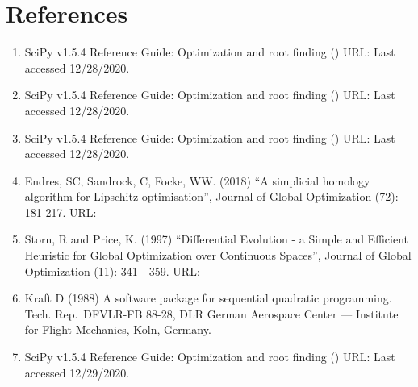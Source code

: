 \documentclass[letterpaper,10pt,english]{sphinxmanual}
\begin{document}
\section{References}
\label{\detokenize{doc-src/optimizers:references}}\begin{enumerate}
\def\theenumi{\arabic{enumi}}
\def\labelenumi{\theenumi .}
\makeatletter\def\p@enumii{\p@enumi \theenumi .}\makeatother
\item {} 
 SciPy v1.5.4 Reference Guide: Optimization
and root finding () URL:
Last accessed 12/28/2020.

\item {} 
 SciPy v1.5.4 Reference
Guide: Optimization and root finding () URL:
Last accessed 12/28/2020.

\item {} 
 SciPy v1.5.4 Reference Guide:
Optimization and root finding () URL:
Last accessed 12/28/2020.

\item {} 
Endres, SC, Sandrock, C, Focke, WW. (2018) “A simplicial homology
algorithm for Lipschitz optimisation”, Journal of Global Optimization
(72): 181-217. URL:

\item {} 
Storn, R and Price, K. (1997) “Differential Evolution - a Simple and
Efficient Heuristic for Global Optimization over Continuous Spaces”,
Journal of Global Optimization (11): 341 - 359. URL:

\item {} 
Kraft D (1988) A software package for sequential quadratic
programming. Tech. Rep. DFVLR-FB 88-28, DLR German Aerospace Center —
Institute for Flight Mechanics, Koln, Germany.

\item {} 
 SciPy v1.5.4 Reference Guide:
Optimization and root finding () URL:
Last accessed 12/29/2020.

\end{enumerate}
\end{document}
